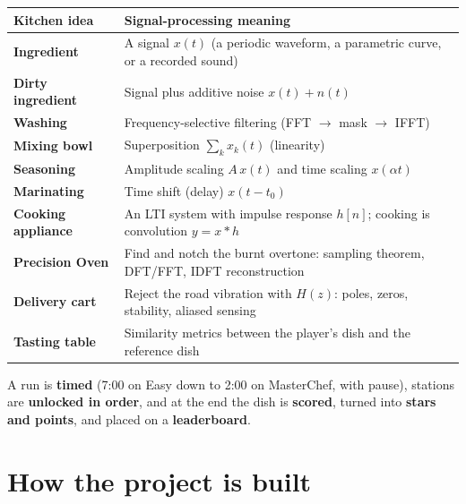 \documentclass[11pt,a4paper]{article}
\begin{document}
\begin{center}
\begin{tabularx}{\linewidth}{@{}>{\bfseries}l X@{}}
\toprule
Kitchen idea & Signal-processing meaning \\
\midrule
Ingredient & A signal $x(t)$ (a periodic waveform, a parametric curve, or a recorded sound) \\
Dirty ingredient & Signal plus additive noise $x(t)+n(t)$ \\
Washing & Frequency-selective filtering (FFT $\rightarrow$ mask $\rightarrow$ IFFT) \\
Mixing bowl & Superposition $\sum_k x_k(t)$ (linearity) \\
Seasoning & Amplitude scaling $A\,x(t)$ and time scaling $x(\alpha t)$ \\
Marinating & Time shift (delay) $x(t-t_0)$ \\
Cooking appliance & An LTI system with impulse response $h[n]$; cooking is convolution $y=x*h$ \\
Precision Oven & Find and notch the burnt overtone: sampling theorem, DFT/FFT, IDFT reconstruction \\
Delivery cart & Reject the road vibration with $H(z)$: poles, zeros, stability, aliased sensing \\
Tasting table & Similarity metrics between the player's dish and the reference dish \\
\bottomrule
\end{tabularx}
\end{center}

A run is \textbf{timed} (7:00 on Easy down to 2:00 on MasterChef, with pause), stations are
\textbf{unlocked in order}, and at the end the dish is \textbf{scored}, turned
into \textbf{stars and points}, and placed on a \textbf{leaderboard}.

\section{How the project is built}
\end{document}
